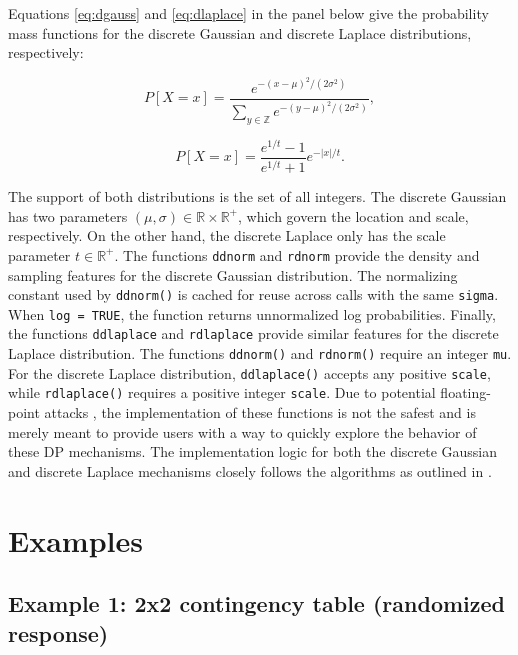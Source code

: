 Equations \eqref{eq:dgauss} and \eqref{eq:dlaplace} in the panel below give the
probability mass functions for the discrete Gaussian and discrete Laplace distributions, respectively:

\begin{equation}
P[X = x] = \dfrac{e^{-(x - \mu)^2/(2\sigma^2)}}{\sum_{y \in \mathbb{Z}} e^{-(y-\mu)^2/(2\sigma^2)}},
\label{eq:dgauss}
\end{equation}

\begin{equation}
P[X = x] = \dfrac{e^{1/t} - 1}{e^{1/t} + 1} e^{-|x|/t}.
\label{eq:dlaplace}
\end{equation}

The support of both distributions is the set of all integers. The discrete Gaussian has
two parameters \((\mu,\sigma) \in \mathbb{R} \times \mathbb{R}^+\), which govern the location and
scale, respectively. On the other hand, the discrete Laplace only has the scale parameter \(t \in \mathbb{R}^+\). The functions \texttt{ddnorm} and \texttt{rdnorm} provide the
density and sampling features for the discrete Gaussian distribution. The normalizing constant used by \texttt{ddnorm()} is cached for reuse across calls with
the same \texttt{sigma}. When \texttt{log\ =\ TRUE}, the function returns unnormalized log
probabilities. Finally, the functions
\texttt{ddlaplace} and \texttt{rdlaplace} provide similar features for the discrete Laplace distribution.
The functions \texttt{ddnorm()} and \texttt{rdnorm()} require an integer \texttt{mu}. For the discrete
Laplace distribution, \texttt{ddlaplace()} accepts any positive \texttt{scale}, while
\texttt{rdlaplace()} requires a positive integer \texttt{scale}. Due to potential floating-point attacks \citep{Mironov2012}, the implementation of these functions is not the safest and is merely meant to provide
users with a way to quickly explore the behavior of these DP mechanisms. The implementation
logic for both the discrete Gaussian and discrete Laplace mechanisms closely follows the algorithms as outlined in \citep{Canonne2022}.

\section{Examples}\label{sec:examples}

\subsection{Example 1: 2x2 contingency table (randomized response)}\label{example-1-2x2-contingency-table-randomized-response}

